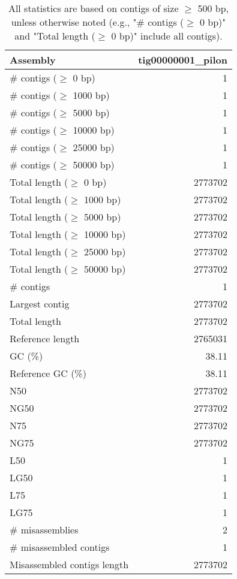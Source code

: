 \documentclass[12pt,a4paper]{article}
\begin{document}
\begin{table}[ht]
\begin{center}
\caption{All statistics are based on contigs of size $\geq$ 500 bp, unless otherwise noted (e.g., "\# contigs ($\geq$ 0 bp)" and "Total length ($\geq$ 0 bp)" include all contigs).}
\begin{tabular}{|l*{1}{|r}|}
\hline
Assembly & tig00000001\_pilon \\ \hline
\# contigs ($\geq$ 0 bp) & 1 \\ \hline
\# contigs ($\geq$ 1000 bp) & 1 \\ \hline
\# contigs ($\geq$ 5000 bp) & 1 \\ \hline
\# contigs ($\geq$ 10000 bp) & 1 \\ \hline
\# contigs ($\geq$ 25000 bp) & 1 \\ \hline
\# contigs ($\geq$ 50000 bp) & 1 \\ \hline
Total length ($\geq$ 0 bp) & 2773702 \\ \hline
Total length ($\geq$ 1000 bp) & 2773702 \\ \hline
Total length ($\geq$ 5000 bp) & 2773702 \\ \hline
Total length ($\geq$ 10000 bp) & 2773702 \\ \hline
Total length ($\geq$ 25000 bp) & 2773702 \\ \hline
Total length ($\geq$ 50000 bp) & 2773702 \\ \hline
\# contigs & 1 \\ \hline
Largest contig & 2773702 \\ \hline
Total length & 2773702 \\ \hline
Reference length & 2765031 \\ \hline
GC (\%) & 38.11 \\ \hline
Reference GC (\%) & 38.11 \\ \hline
N50 & 2773702 \\ \hline
NG50 & 2773702 \\ \hline
N75 & 2773702 \\ \hline
NG75 & 2773702 \\ \hline
L50 & 1 \\ \hline
LG50 & 1 \\ \hline
L75 & 1 \\ \hline
LG75 & 1 \\ \hline
\# misassemblies & 2 \\ \hline
\# misassembled contigs & 1 \\ \hline
Misassembled contigs length & 2773702 \\ \hline

\end{tabular}
\end{center}
\end{table}
\end{document}
